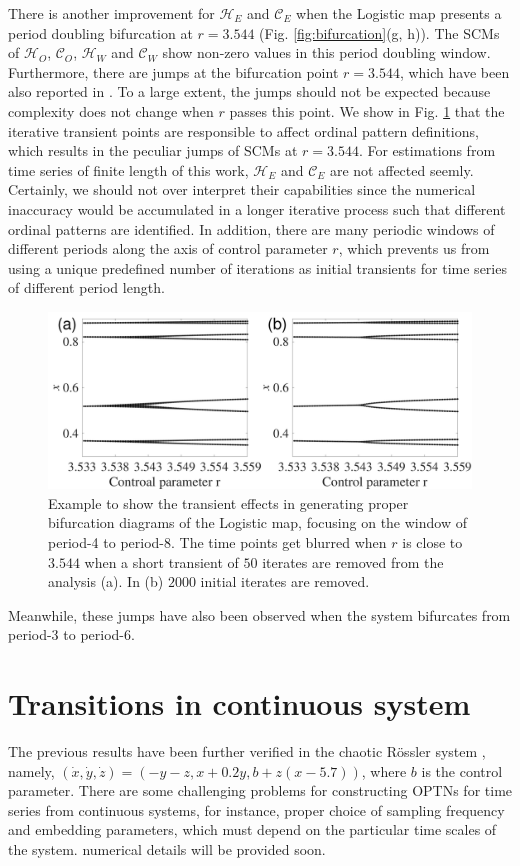 \documentclass[12pt,aip,cha,reprint,nofootinbib]{revtex4-1}
\begin{document}
There is another improvement for $\mathcal{H}_E$ and $\mathcal{C}_E$ when the Logistic map presents a period doubling bifurcation at $r = 3.544$ (Fig. \ref{fig:bifurcation}(g, h)). The SCMs of $\mathcal{H}_O$,  $\mathcal{C}_O$, $\mathcal{H}_W$ and $\mathcal{C}_W$ show non-zero values in this period doubling window. Furthermore, there are jumps at the bifurcation point $r = 3.544$, which have been also reported in \cite{BandtPRL2002}. To a large extent, the jumps should not be expected because complexity does not change when $r$ passes this point. We show in Fig. \ref{fig:transient} that the iterative transient points are responsible to affect ordinal pattern definitions, which results in the peculiar jumps of SCMs at $r = 3.544$. For estimations from time series of finite length of this work, $\mathcal{H}_E$ and $\mathcal{C}_E$ are not affected seemly. Certainly, we should not over interpret their capabilities since the numerical inaccuracy would be accumulated in a longer iterative process such that different ordinal patterns are identified. In addition, there are many periodic windows of different periods along the axis of control parameter $r$, which prevents us from using a unique predefined number of iterations as initial transients for time series of different period length. 
\begin{figure}
	\centering
	\includegraphics[width=\columnwidth]{period4_exampleTransients.pdf}
\caption{\small{Example to show the transient effects in generating proper bifurcation diagrams of the Logistic map, focusing on the window of period-4 to period-8. The time points get blurred when $r$ is close to $3.544$ when a short transient of $50$ iterates are removed from the analysis (a). In (b) $2000$ initial iterates are removed. }\label{fig:transient}}
\end{figure}
Meanwhile, these jumps have also been observed when the system bifurcates from period-3 to period-6. 

\section{Transitions in continuous system}
The previous results have been further verified in the chaotic R\"ossler system \cite{Roessler1976}, namely, $(\dot{x}, \dot{y}, \dot{z}) = (-y-z, x+0.2y, b+z(x-5.7))$, where $b$ is the control parameter. There are some challenging problems for constructing OPTNs for time series from continuous systems, for instance, proper choice of sampling frequency and embedding parameters, which must depend on the particular time scales of the system. {\color{red} numerical details will be provided soon. }
\end{document}
